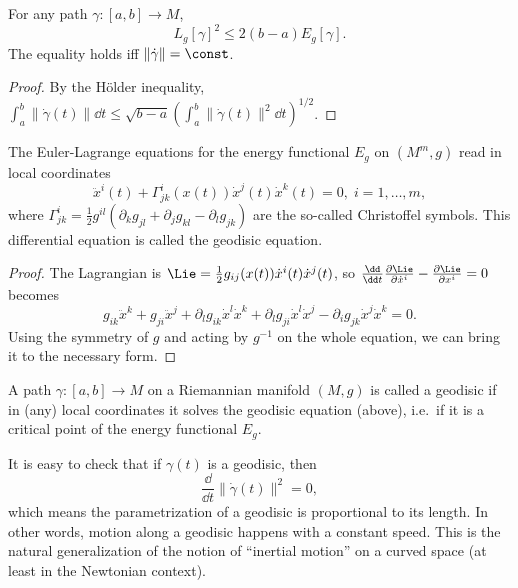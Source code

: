 \begin{lem}\label{length<energy lemma}
For any path $\gamma:[a,b]\to M$, 
\[L_g[\gamma]^2\leq 2(b-a)E_g[\gamma].\] The equality holds iff $\lVert \dot\gamma \rVert =\const$.
\end{lem}
\begin{proof}
    By the H\"older inequality, $\int_a^b \lVert \dot\gamma(t)\rVert \dd t\leq \sqrt{b-a} \left(\int_a^b \lVert \dot\gamma(t)\rVert^2\dd t\right)^{1/2}$.
\end{proof}

\begin{lem}
    The Euler-Lagrange equations for the energy functional $E_g$ on $(M^m,g)$ read in local coordinates 
    \[\ddot x^i(t)+\Gamma^i_{jk}(x(t))\dot x^j(t)\dot x^k(t)=0,\; i=1,\ldots,m,\]
    where $\Gamma^i_{jk}=\frac 12 g^{il}(\partial_k g_{jl}+\partial_jg_{kl}-\partial_l g_{jk})$ are the so-called Christoffel symbols. This differential equation is called the geodisic equation.
\end{lem}
\begin{proof}
    The Lagrangian is $\Lie=\frac12 g_{ij}(x(t))\dot x^i(t)\dot x^j(t)$, so $\frac{\dd}{\dd t}\frac{\partial\Lie}{\partial \dot x^i}-\frac{\partial \Lie}{\partial x^i}=0$ becomes 
    \[g_{ik}\ddot x^k+g_{ji}\ddot x^j+\partial_l g_{ik}\dot x^l\dot x^k+\partial_l g_{ji}\dot x^l\dot x^j-\partial_i g_{jk}\dot x^j\dot x^k=0.\]
    Using the symmetry of $g$ and acting by $g^{-1}$ on the whole equation, we can bring it to the necessary form.
\end{proof}

\begin{defn}[Geodisic]
    A path $\gamma:[a,b]\to M$ on a Riemannian manifold $(M,g)$ is called a geodisic if in (any) local coordinates it solves the geodisic equation (above), i.e.\ if it is a critical point of the energy functional $E_g$.
\end{defn}

It is easy to check that if $\gamma(t)$ is a geodisic, then 
\[\frac{\dd}{\dd t}\lVert \dot\gamma(t)\rVert^2=0,\]
which means the parametrization of a geodisic is proportional to its length. In other words, motion along a geodisic happens with a constant speed. This is the natural generalization of the notion of ``inertial motion'' on a curved space (at least in the Newtonian context).


